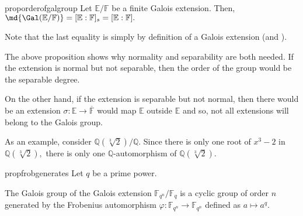 \begin{restatable}[]{prop}{orderofgalgroup}
\label{prop:orderofgalgroup}
    Let $\mathbb{E}/\mathbb{F}$ be a finite Galois extension. Then, $\md{\Gal(\mathbb{E}/\mathbb{F})} = [\mathbb{E} : \mathbb{F}]_s = [\mathbb{E} : \mathbb{F}].$ \hfill\hyperref[prop:orderofgalgroup2]{\downsym}
\end{restatable}
Note that the last equality is simply by definition of a Galois extension (and ).

\begin{rem}
    The above proposition shows why normality and separability are both needed. If the extension is normal but not separable, then the order of the group would be the separable degree.

    On the other hand, if the extension is separable but not normal, then there would be an extension $\sigma : \mathbb{E} \to \overline{\mathbb{F}}$ would map $\mathbb{E}$ outside $\mathbb{E}$ and so, not all extensions will belong to the Galois group.

    As an example, consider $\mathbb{Q}(\sqrt[3]{2})/\mathbb{Q}.$ Since there is only one root of $x^3 - 2$ in $\mathbb{Q}(\sqrt[3]{2}),$ there is only one $\mathbb{Q}$-automorphism of $\mathbb{Q}(\sqrt[3]{2}).$
\end{rem}

\begin{restatable}[]{prop}{frobgenerates}
\label{prop:frobgenerates}
    Let $q$ be a prime power.

    The Galois group of the Galois extension $\mathbb{F}_{q^n}/\mathbb{F}_q$ is a cyclic group of order $n$ generated by the Frobenius automorphism $\varphi : \mathbb{F}_{q^n} \to \mathbb{F}_{q^n}$ defined as $a \mapsto a^q.$ \hfill\hyperref[prop:frobgenerates2]{\downsym}
\end{restatable}

